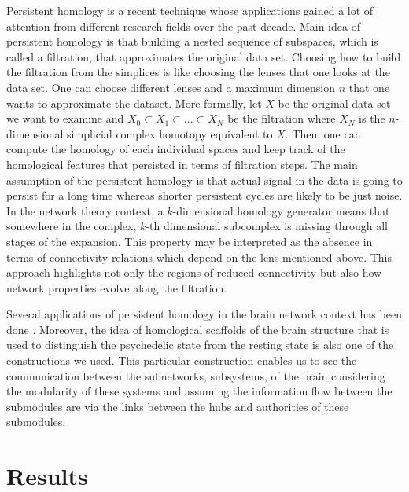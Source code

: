 \documentclass[9pt,twocolumn,twoside,lineno]{pnas-new}
\begin{document}
Persistent homology is a recent technique whose applications gained a lot of attention from different research fields over the past decade. Main idea of persistent homology is that building a nested sequence of subspaces, which is called a filtration, that approximates the original data set. Choosing how to build the filtration from the simplices is like choosing the lenses that one looks at the data set\cite{pershomsimplif}. One can choose different lenses and a maximum dimension $n$ that one wants to approximate the dataset. More formally, let $X$ be the original data set we want to examine and $X_{0}\subset X_{1}\subset...\subset X_{N}$ be the filtration where $X_{N} $ is the $n$-dimensional simplicial complex homotopy equivalent to $X$. Then, one can compute the homology of each individual spaces and keep track of the homological features that persisted in terms of filtration steps.  The main assumption of the persistent homology is that actual signal in the data is going to persist for a long time whereas shorter persistent cycles are likely to be just noise. In the network theory context, a $k$-dimensional homology generator means that somewhere in the complex, $k$-th dimensional subcomplex is missing through all stages of the expansion. This property may be interpreted as the absence in terms of connectivity relations which depend on the lens mentioned above. This approach highlights not only the regions of reduced connectivity but also how network properties evolve along the filtration.

Several applications of persistent homology in the brain network context has been done \cite{dendogram,pershombrainnetw,struc-funcpershom}. Moreover, the idea of homological scaffolds of the brain structure that is used to distinguish the psychedelic state from the resting state  \cite{scaffold} is also one of the constructions we used\cite{strata}. This particular construction enables us to see the communication between the subnetworks, subsystems, of the brain considering the modularity of these systems and assuming the information flow between the submodules are via the links between the hubs and authorities of these submodules.




\section*{Results}
\end{document}
